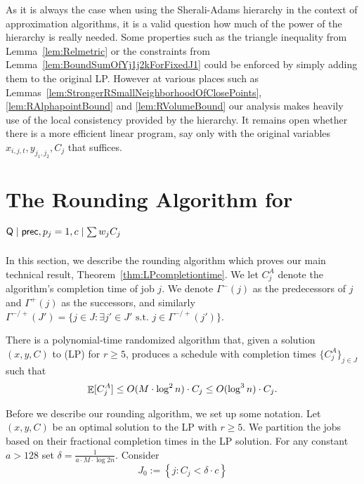   As it is always the case when using the Sherali-Adams hierarchy in the context of approximation algorithms,
  it is a valid question how much of the power of the hierarchy is really needed. Some properties
  such as the triangle inequality from Lemma~\ref{lem:Relmetric} or the constraints from Lemma~\ref{lem:BoundSumOfYj1j2kForFixedJ1} could be enforced by simply adding them to the original LP. However at various places such as Lemmas~\ref{lem:StrongerRSmallNeighborhoodOfClosePoints}, \ref{lem:RAlphapointBound} and \ref{lem:RVolumeBound} our analysis makes heavily use of the local consistency provided by the hierarchy. It remains open whether there is a more efficient linear program, say only with the original
  variables $x_{i,j,t},y_{j_1,j_2},C_j$ that suffices.
  
  \section{The Rounding Algorithm for $\mathsf{Q} \mid \mathsf{prec}, p_j=1, c \mid \sum w_j C_j$}
  \label{sec:Rounding}
  
  
  In this section, we describe the rounding algorithm which proves our main technical result, Theorem~\ref{thm:LPcompletiontime}.
  We let $C_j^A$ denote the algorithm's completion time of job $j$.
  We denote $\Gamma^{-}(j)$ as the predecessors of $j$ and $\Gamma^+(j)$ as the successors, 
  and similarly $\Gamma^{-/+}(J') = \{ j \in J : \exists j' \in J' \textrm{ s.t. } j \in \Gamma^{-/+}(j') \}$. 
  
  \begin{theorem}
  \label{thm:LPcompletiontime}
  There is a polynomial-time randomized algorithm that,
  given a solution $(x,y,C)$ to (LP) for $r \geq 5$,
  produces a schedule with completion times 
  $\{C^A_j\}_{j \in J}$ such that $$\mathop{\mathbb{E}}[C^A_j] \leq O(M \cdot \log^2 n) \cdot C_j \leq O(\log ^3 n) \cdot C_j.$$
  \end{theorem}
  
  Before we describe our rounding algorithm, we set up some notation.
  Let $(x, y, C)$ be an optimal solution to the LP with $r \geq 5$.
  We partition the jobs based on their fractional completion times in the LP solution. 
  For any constant $a > 128$ set $\delta = \frac{1}{a \cdot M \cdot \log 2n }$. 
  Consider
  \begin{equation}
  J_0 := \left \{ j : C_j <  \delta  \cdot c \right \}
  \end{equation}
  
